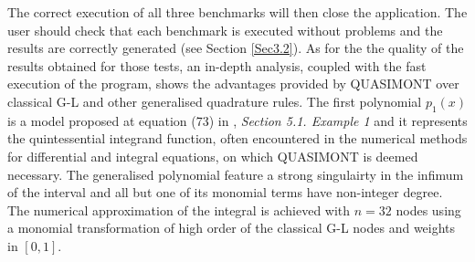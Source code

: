 \documentclass[a4paper, twosided]{book}
\begin{document}
\noindent
The correct execution of all three benchmarks will then close the application. The user should check that each benchmark is executed without problems and the results are correctly generated (see Section \ref{Sec3.2}). As for the the quality of the results obtained for those tests, an in-depth analysis, coupled with the fast execution of the program, shows the advantages provided by QUASIMONT over classical G-L and other generalised quadrature rules. The first polynomial $p_1(x)$ is a model proposed at equation (73) in \cite{Lombardi09}, \textsl{Section 5.1. Example 1} and it represents the quintessential integrand function, often encountered in the numerical methods for differential and integral equations, on which QUASIMONT is deemed necessary. The generalised polynomial feature a strong singulairty in the infimum of the interval and all but one of its monomial terms have non-integer degree. The numerical approximation of the integral is achieved with $n=32$ nodes using a monomial transformation of high order of the classical G-L nodes and weights in $[0,1]$.
\end{document}

